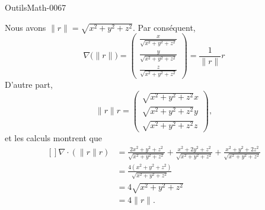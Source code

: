 
\begin{corrige}{OutilsMath-0067}

    Nous avons $\| r \|=\sqrt{x^2+y^2+z^2}$. Par conséquent,
    \begin{equation}
        \nabla\big( \| r \| \big)=\begin{pmatrix}
            \frac{ x }{ \sqrt{x^2+y^2+z^2} }    \\ 
            \frac{ y }{ \sqrt{x^2+y^2+z^2} }    \\ 
            \frac{ z }{ \sqrt{x^2+y^2+z^2} }    
        \end{pmatrix}=\frac{1}{ \| r \| } r
    \end{equation}
    D'autre part,
    \begin{equation}
        \| r \|r=\begin{pmatrix}
            \sqrt{x^2+y^2+z^2}x    \\ 
            \sqrt{x^2+y^2+z^2}y    \\ 
            \sqrt{x^2+y^2+z^2}z   
        \end{pmatrix},
    \end{equation}
    et les calculs montrent que
    \begin{equation}
        \begin{aligned}[]
            \nabla\cdot(\| r \|r)&=\frac{ 2x^2+y^2+z^2 }{ \sqrt{x^2+y^2+z^2} }+\frac{ x^2+2y^2+z^2 }{ \sqrt{x^2+y^2+z^2} }+\frac{ x^2+y^2+2z^2 }{ \sqrt{x^2+y^2+z^2} }\\
            &=\frac{ 4(x^2+y^2+z^2) }{ \sqrt{x^2+y^2+z^2} }\\
            &=4\sqrt{x^2+y^2+z^2}\\
            &=4\| r \|.
        \end{aligned}
    \end{equation}

\end{corrige}
